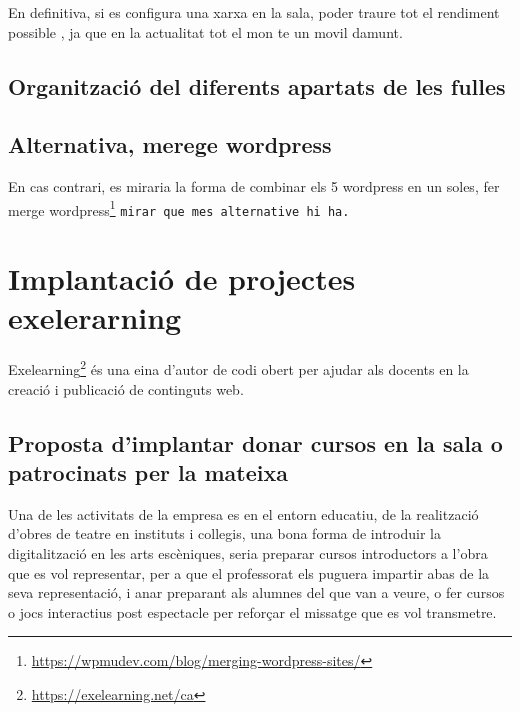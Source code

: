 \documentclass[
  10pt,
]{krantz}
\DeclareRobustCommand{\href}[2]{#2\footnote{\url{#1}}}
\begin{document}
En definitiva, si es configura una xarxa en la sala, poder traure tot el rendiment possible , ja que en la actualitat tot el mon te un movil damunt.

\hypertarget{organitzaciuxf3-del-diferents-apartats-de-les-fulles}{%
\section{Organització del diferents apartats de les fulles}\label{organitzaciuxf3-del-diferents-apartats-de-les-fulles}}

\hypertarget{alternativa-merege-wordpress}{%
\section{Alternativa, merege wordpress}\label{alternativa-merege-wordpress}}

En cas contrari, es miraria la forma de combinar els 5 wordpress en un soles, fer \href{https://wpmudev.com/blog/merging-wordpress-sites/}{merge wordpress} \texttt{mirar\ que\ mes\ alternative\ hi\ ha.}

\hypertarget{implantaciuxf3-de-projectes-exelerarning}{%
\chapter{Implantació de projectes exelerarning}\label{implantaciuxf3-de-projectes-exelerarning}}

\href{https://exelearning.net/ca}{Exelearning} és una eina d'autor de codi obert per ajudar als docents en la creació i publicació de continguts web.

\hypertarget{proposta-dimplantar-donar-cursos-en-la-sala-o-patrocinats-per-la-mateixa}{%
\section{Proposta d'implantar donar cursos en la sala o patrocinats per la mateixa}\label{proposta-dimplantar-donar-cursos-en-la-sala-o-patrocinats-per-la-mateixa}}

Una de les activitats de la empresa es en el entorn educatiu, de la realització d'obres de teatre en instituts i collegis, una bona forma de introduir la digitalització en les arts escèniques, seria preparar cursos introductors a l'obra que es vol representar, per a que el professorat els puguera impartir abas de la seva representació, i anar preparant als alumnes del que van a veure, o fer cursos o jocs interactius post espectacle per reforçar el missatge que es vol transmetre.
\end{document}
